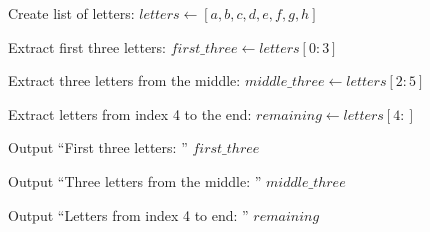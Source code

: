 \begin{algorithm}
\caption{Display Slices of an Alphabet List}
\begin{algorithmic}[1]

\STATE Create list of letters:
\STATE $letters \gets [a,b,c,d,e,f,g,h]$

\STATE Extract first three letters:
\STATE $first\_three \gets letters[0:3]$

\STATE Extract three letters from the middle:
\STATE $middle\_three \gets letters[2:5]$

\STATE Extract letters from index 4 to the end:
\STATE $remaining \gets letters[4:]$

\STATE Output ``First three letters: '' $first\_three$

\STATE Output ``Three letters from the middle: '' $middle\_three$

\STATE Output ``Letters from index 4 to end: '' $remaining$

\end{algorithmic}
\end{algorithm}
